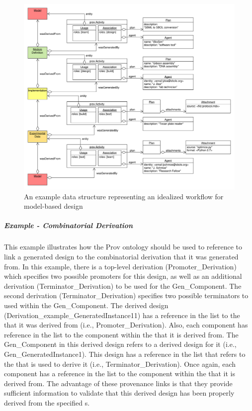 \begin{figure}[ht]
\begin{center}
\includegraphics[width=\linewidth]{uml/design-build-test}
\caption[]{An example data structure representing an idealized workflow for model-based
design}
\label{images:design-build-test-learn}
\end{center}
\end{figure}

\clearpage

\subparagraph{Example - Combinatorial Derivation}
This example illustrates how the Prov ontology should be used to reference to link a generated design to the combinatorial derivation that it was generated from.  In this example, there is a top-level derivation (Promoter\_Derivation) which specifies two possible promoters for this design, as well as an additional derivation (Terminator\_Derivation) to be used for the Gen\_Component.  The second derivation (Terminator\_Derivation) specifies two possible terminators to used within the Gen\_Component.  The derived design (Derivation\_example\_GeneratedInstance11) has a reference in the  list to the  that it was derived from (i.e., Promoter\_Derivation).  Also, each component has reference in the  list to the component within the  that it is derived from.  The Gen\_Component in this derived design refers to a derived design for it (i.e., Gen\_GeneratedInstance1).  This design has a reference in the  list that refers to the  that is used to derive it (i.e., Terminator\_Derivation).  Once again, each component has a reference in the  list to the component within the  that it is derived from.  The advantage of these provenance links is that they provide sufficient information to validate that this derived design has been properly derived from the specified s.

